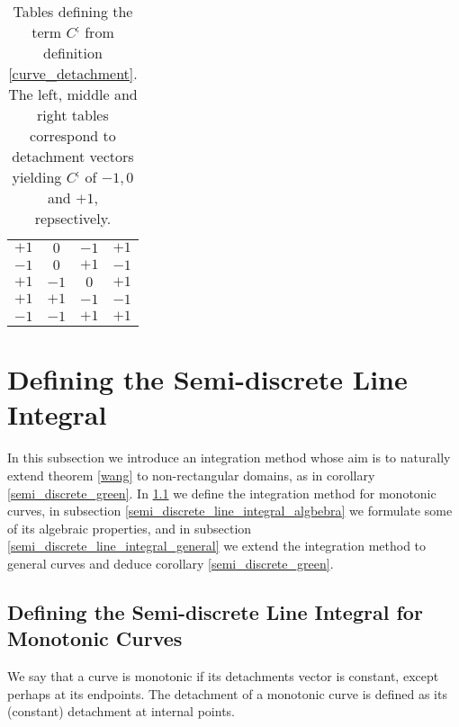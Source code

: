 \documentclass[11pt]{book}
\begin{document}
\begin{table}
\begin{tabular}{cccc}
        $+1$ & $0$ & $-1$ & $+1$\\
        $-1$ & $0$ & $+1$ & $-1$\\
    $+1$ & $-1$ & $0$ & $+1$\\
        $+1$ & $+1$ & $-1$ & $-1$\\
        $-1$ & $-1$ & $+1$ & $+1$\\ 
        \bottomrule
        \end{tabular}
\bigskip
\caption{Tables defining the term $C^;$ from definition \ref{curve_detachment}. The left, middle and right tables correspond to detachment vectors yielding $C^;$ of $-1,0$ and $+1$, repsectively.}
\label{detachments_table}
\end{table}
\section{Defining the Semi-discrete Line Integral}\label{semi_discrete_line_integral_section}In this subsection we introduce
an integration method whose aim is to naturally extend theorem \ref{wang}
to non-rectangular domains, as in corollary \ref{semi_discrete_green}. In \ref{semi_discrete_line_integral_monotonic} we define the
integration method for monotonic curves, in subsection \ref{semi_discrete_line_integral_algbebra} we formulate
some of its algebraic properties, and in subsection \ref{semi_discrete_line_integral_general} we extend the integration method to general curves and deduce corollary \ref{semi_discrete_green}.

\subsection{Defining the Semi-discrete Line Integral for Monotonic Curves} \label{semi_discrete_line_integral_monotonic}
\begin{definition}
We say that a curve is monotonic if its detachments vector is constant, except perhaps at its endpoints.  The detachment of a monotonic curve is defined as its (constant) detachment at internal points.
\end{definition}
\end{document}
